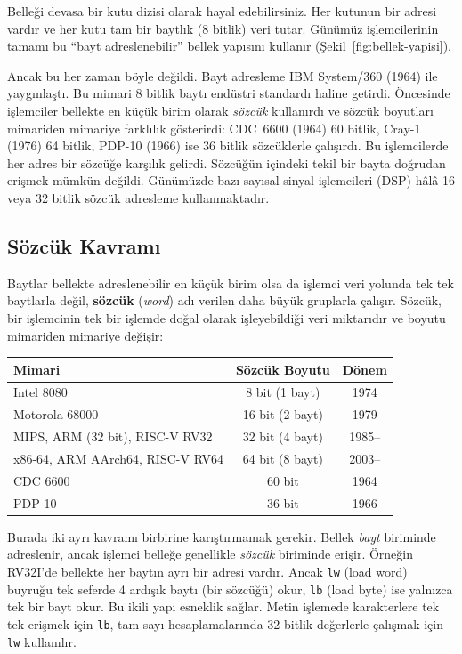 Belleği devasa bir kutu dizisi olarak hayal edebilirsiniz. Her kutunun bir adresi vardır ve her kutu tam bir baytlık (8 bitlik) veri tutar. Günümüz işlemcilerinin tamamı bu ``bayt adreslenebilir'' bellek yapısını kullanır (Şekil~\ref{fig:bellek-yapisi}).

Ancak bu her zaman böyle değildi. Bayt adresleme IBM System/360 (1964) ile yaygınlaştı. Bu mimari 8 bitlik baytı endüstri standardı haline getirdi. Öncesinde işlemciler bellekte en küçük birim olarak \emph{sözcük} kullanırdı ve sözcük boyutları mimariden mimariye farklılık gösterirdi: CDC~6600 (1964) 60 bitlik, Cray-1 (1976) 64 bitlik, PDP-10 (1966) ise 36 bitlik sözcüklerle çalışırdı. Bu işlemcilerde her adres bir sözcüğe karşılık gelirdi. Sözcüğün içindeki tekil bir bayta doğrudan erişmek mümkün değildi. Günümüzde bazı sayısal sinyal işlemcileri (DSP) hâlâ 16 veya 32 bitlik sözcük adresleme kullanmaktadır.

\subsection{Sözcük Kavramı}
Baytlar bellekte adreslenebilir en küçük birim olsa da işlemci veri yolunda tek tek baytlarla değil, \textbf{sözcük} (\emph{word}) adı verilen daha büyük gruplarla çalışır. Sözcük, bir işlemcinin tek bir işlemde doğal olarak işleyebildiği veri miktarıdır ve boyutu mimariden mimariye değişir:

\begin{center}
\small
\begin{tabular}{lcc}
\toprule
\textbf{Mimari} & \textbf{Sözcük Boyutu} & \textbf{Dönem} \\
\midrule
Intel 8080 & 8 bit (1 bayt) & 1974 \\
Motorola 68000 & 16 bit (2 bayt) & 1979 \\
MIPS, ARM (32 bit), RISC-V RV32 & 32 bit (4 bayt) & 1985-- \\
x86-64, ARM AArch64, RISC-V RV64 & 64 bit (8 bayt) & 2003-- \\
CDC 6600 & 60 bit & 1964 \\
PDP-10 & 36 bit & 1966 \\
\bottomrule
\end{tabular}
\end{center}

Burada iki ayrı kavramı birbirine karıştırmamak gerekir. Bellek \emph{bayt} biriminde adreslenir, ancak işlemci belleğe genellikle \emph{sözcük} biriminde erişir. Örneğin RV32I'de bellekte her baytın ayrı bir adresi vardır. Ancak \texttt{lw} (load word) buyruğu tek seferde 4 ardışık baytı (bir sözcüğü) okur, \texttt{lb} (load byte) ise yalnızca tek bir bayt okur. Bu ikili yapı esneklik sağlar. Metin işlemede karakterlere tek tek erişmek için \texttt{lb}, tam sayı hesaplamalarında 32 bitlik değerlerle çalışmak için \texttt{lw} kullanılır.

